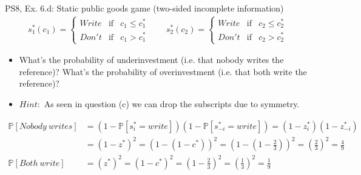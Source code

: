 \begin{frame}{PS8, Ex. 6.d: Static public goods game (two-sided incomplete information)}
    \begin{align*}
      s_1^*(c_1)=\left\{\begin{array}{rcl}
        Write & \text{if} & c_1\leq c_1^*\\
        Don't & \text{if} & c_1>c_1^*
        \end{array}\right.\quad\quad
      s_2^*(c_2)=\left\{\begin{array}{rcl}
        Write & \text{if} & c_2\leq c_2^*\\
        Don't & \text{if} & c_2>c_2^*
        \end{array}\right.
    \end{align*}
    \vspace{-12pt}
    \begin{itemize}
      \item[(d)] What’s the probability of underinvestment (i.e. that nobody writes the reference)? What’s the probability of overinvestment (i.e. that both write the reference)?
      \item[]    $Hint:$ As seen in question (c) we can drop the subscripts due to symmetry.
    \end{itemize}
    \vspace{-8pt}
    \begin{align*}
      \mathbb{P}[Nobody\ writes]&=(1-\mathbb{P}[s_{i}^*=write])(1-\mathbb{P}[s_{-i}^*=write])=(1-z_{i}^*)(1-z_{-i}^*)\\
                                &=(1-z^*)^2=(1-(1-c^*))^2=\left(1-\left(1-\frac{2}{3}\right)\right)^2=\left(\frac{2}{3}\right)^2=\frac{4}{9}\\
      \mathbb{P}[Both\ write]&=(z^*)^2=(1-c^*)^2=\left(1-\frac{2}{3}\right)^2=\left(\frac{1}{3}\right)^2=\frac{1}{9}
    \end{align*}
    \vfill\null
\end{frame}
